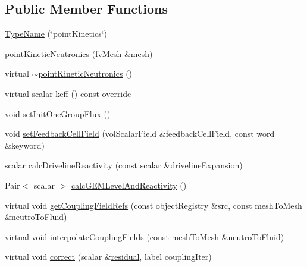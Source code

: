 \subsection*{Public Member Functions}
\begin{DoxyCompactItemize}
\item 
\hyperlink{classFoam_1_1pointKineticNeutronics_abe23deccc930f2fa1429fad7958c8a10}{Type\+Name} (\char`\"{}point\+Kinetics\char`\"{})
\item 
\hyperlink{classFoam_1_1pointKineticNeutronics_a79e6b4ce48b37f06154f436bd9229a43}{point\+Kinetic\+Neutronics} (fv\+Mesh \&\hyperlink{classFoam_1_1neutronics_a8bb1e58291d2d2b653e024a4f4bffe38}{mesh})
\item 
virtual \hyperlink{classFoam_1_1pointKineticNeutronics_a12228efef9ef75d41a127bc3cac5cbbc}{$\sim$point\+Kinetic\+Neutronics} ()
\item 
virtual scalar \hyperlink{classFoam_1_1pointKineticNeutronics_ae9f7e220f9ccd96de428a0eb4a8f9da0}{keff} () const override
\item 
void \hyperlink{classFoam_1_1pointKineticNeutronics_adf80d7d9d3b901c0a3a65d7930fef8c8}{set\+Init\+One\+Group\+Flux} ()
\item 
void \hyperlink{classFoam_1_1pointKineticNeutronics_ae3d245b63b71f38b05eb1b4ea12eb99c}{set\+Feedback\+Cell\+Field} (vol\+Scalar\+Field \&feedback\+Cell\+Field, const word \&keyword)
\item 
scalar \hyperlink{classFoam_1_1pointKineticNeutronics_a97acf01cc398eecb3c434d334f5a3744}{calc\+Driveline\+Reactivity} (const scalar \&driveline\+Expansion)
\item 
Pair$<$ scalar $>$ \hyperlink{classFoam_1_1pointKineticNeutronics_aac856fe36d9b9a04679a37602e4017b6}{calc\+G\+E\+M\+Level\+And\+Reactivity} ()
\item 
virtual void \hyperlink{classFoam_1_1pointKineticNeutronics_a92e79ddc2a3b75672fd0abdb39c642a5}{get\+Coupling\+Field\+Refs} (const object\+Registry \&src, const mesh\+To\+Mesh \&\hyperlink{createMeshInterpolators_8H_aa7d8334dd5ea1819a83900ea05ace02f}{neutro\+To\+Fluid})
\item 
virtual void \hyperlink{classFoam_1_1pointKineticNeutronics_a8b317ca01efa1efb32264be43472ec10}{interpolate\+Coupling\+Fields} (const mesh\+To\+Mesh \&\hyperlink{createMeshInterpolators_8H_aa7d8334dd5ea1819a83900ea05ace02f}{neutro\+To\+Fluid})
\item 
virtual void \hyperlink{classFoam_1_1pointKineticNeutronics_ae019379f6473a5b4fa9fcf696c9a4235}{correct} (scalar \&\hyperlink{solveThermalMechanics_8H_a840cf6bbf9aacf15bd364b478394c3a7}{residual}, label coupling\+Iter)

\end{DoxyCompactItemize}
